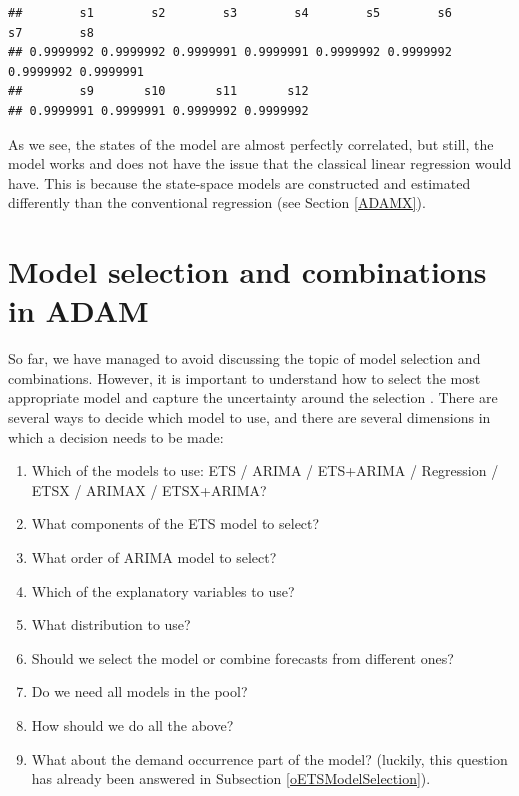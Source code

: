 \documentclass[
]{book}
\newenvironment{Shaded}{\begin{snugshade}}{\end{snugshade}}
\newcommand{\CommentTok}[1]{\textcolor[rgb]{0.56,0.35,0.01}{\textit{#1}}}
\newcommand{\DecValTok}[1]{\textcolor[rgb]{0.00,0.00,0.81}{#1}}
\newcommand{\FunctionTok}[1]{\textcolor[rgb]{0.00,0.00,0.00}{#1}}
\newcommand{\NormalTok}[1]{#1}
\newcommand{\OtherTok}[1]{\textcolor[rgb]{0.56,0.35,0.01}{#1}}
\newcommand{\SpecialCharTok}[1]{\textcolor[rgb]{0.00,0.00,0.00}{#1}}
\newcommand{\StringTok}[1]{\textcolor[rgb]{0.31,0.60,0.02}{#1}}
\providecommand{\tightlist}{%
  \setlength{\itemsep}{0pt}\setlength{\parskip}{0pt}}
\theoremstyle{definition}
\theoremstyle{definition}
\theoremstyle{definition}
\theoremstyle{definition}
\theoremstyle{remark}
\begin{document}
\begin{Shaded}
\end{Shaded}

\begin{verbatim}
##        s1        s2        s3        s4        s5        s6        s7        s8 
## 0.9999992 0.9999992 0.9999991 0.9999991 0.9999992 0.9999992 0.9999992 0.9999991 
##        s9       s10       s11       s12 
## 0.9999991 0.9999991 0.9999992 0.9999992
\end{verbatim}

As we see, the states of the model are almost perfectly correlated, but still, the model works and does not have the issue that the classical linear regression would have. This is because the state-space models are constructed and estimated differently than the conventional regression (see Section \ref{ADAMX}).

\hypertarget{ADAMSelection}{%
\chapter{Model selection and combinations in ADAM}\label{ADAMSelection}}

So far, we have managed to avoid discussing the topic of model selection and combinations. However, it is important to understand how to select the most appropriate model and capture the uncertainty around the selection \citep[see discussion of sources of uncertainty in Section 1.3 of][]{SvetunkovSBA}. There are several ways to decide which model to use, and there are several dimensions in which a decision needs to be made:

\begin{enumerate}
\def\labelenumi{\arabic{enumi}.}
\tightlist
\item
  Which of the models to use: ETS / ARIMA / ETS+ARIMA / Regression / ETSX / ARIMAX / ETSX+ARIMA?
\item
  What components of the ETS model to select?
\item
  What order of ARIMA model to select?
\item
  Which of the explanatory variables to use?
\item
  What distribution to use?
\item
  Should we select the model or combine forecasts from different ones?
\item
  Do we need all models in the pool?
\item
  How should we do all the above?
\item
  What about the demand occurrence part of the model? (luckily, this question has already been answered in Subsection \ref{oETSModelSelection}).
\end{enumerate}
\end{document}
